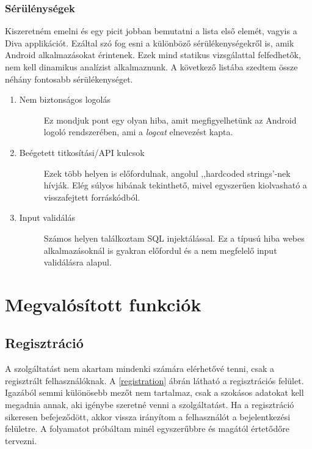 \documentclass{thesis-ekf}
\theoremstyle{definition}
\theoremstyle{remark}
\begin{document}
\subsection{Sérülénységek}

Kiszeretném emelni és egy picit jobban bemutatni a lista első elemét, vagyis a Diva applikációt.
Ezáltal szó fog esni a különböző sérülékenységekről is, amik Android alkalmazásokat érintenek.
Ezek mind statikus vizsgálattal felfedhetők, nem kell dinamikus analízist alkalmaznunk.
A következő listába szedtem össze néhány fontosabb sérülékenységet.

\begin{enumerate}
	\item
	\begin{description}
		\item[Nem biztonságos logolás] Ez mondjuk pont egy olyan hiba, amit megfigyelhetünk az Android logoló rendszerében, ami a \emph{logcat} elnevezést kapta.
	\end{description}
	\item
	\begin{description}
		\item [Beégetett titkosítási/API kulcsok] Ezek több helyen is előfordulnak, angolul ,,hardcoded strings'-nek hívják. Elég súlyos hibának tekinthető, mivel egyszerűen kiolvasható a visszafejtett forráskódból.
	\end{description}
	\item
	\begin{description}
		\item [Input validálás] Számos helyen találkoztam SQL injektálással. Ez a típusú hiba webes alkalmazásoknál is gyakran előfordul és a nem megfelelő input validálásra alapul.
	\end{description}
\end{enumerate}

\chapter{Megvalósított funkciók}\label{funkciok}

\section{Regisztráció}

A szolgáltatást nem akartam mindenki számára elérhetővé tenni, csak a regisztrált felhasználóknak.
A \ref{registration} ábrán látható a regisztrációs felület.
Igazából semmi különösebb mezőt nem tartalmaz, csak a szokásos adatokat kell megadnia annak, aki igénybe szeretné venni a szolgáltatást.
Ha a regisztráció sikeresen befejeződött, akkor vissza irányítom a felhasználót a bejelentkezési felületre.
A folyamatot próbáltam minél egyszerűbbre és magától értetődőre tervezni.
\end{document}
